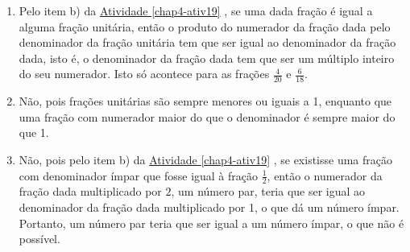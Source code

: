 \begin{solucao}{}{}
\begin{enumerate} [\quad a)] %
    \item       Pelo item b) da \hyperref[chap4-ativ19]{Atividade \ref{chap4-ativ19}}      , se uma dada fração é
igual a alguma fração unitária, então o produto do numerador da fração dada pelo
denominador da fração unitária tem que ser igual ao denominador da fração dada,
isto é, o denominador da fração dada tem que ser um múltiplo inteiro do seu
numerador. Isto só acontece para as frações       $\frac{4}{20}$       e
$\frac{6}{18}$.
    \item       Não, pois frações unitárias são sempre menores ou iguais a 1,
enquanto que uma fração com numerador maior do que o denominador é sempre maior
do que 1.

    \item       Não, pois pelo item b) da \hyperref[chap4-ativ19]{Atividade \ref{chap4-ativ19}}      , se
existisse uma fração com denominador ímpar que fosse igual à fração
$\frac{1}{2}$, então o numerador da fração dada multiplicado por       $2$, um
número par, teria que ser igual ao denominador da fração dada multiplicado por
1, o que dá um número ímpar. Portanto, um número par teria que ser igual a um
número ímpar, o que não é possível.
\end{enumerate} %

\end{solucao}


